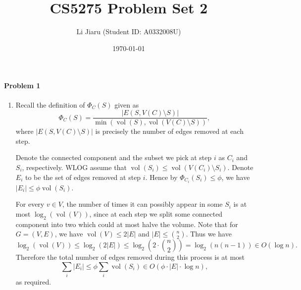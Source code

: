 \documentclass[12pt]{article}
\title{CS5275 Problem Set 2}
\author{Li Jiaru (Student ID: A0332008U)}
\date{\today}
\DeclareMathOperator{\vol}{vol}
\DeclareMathOperator{\sm}{\setminus}
\begin{document}
\maketitle
\paragraph{Problem 1}
\begin{enumerate}[label=\alph*., font=\bfseries]
\item Recall the definition of $\Phi_C(S)$ given as
$$\Phi_C(S)=\frac{|E(S,V(C)\sm S)|}{\min(\vol(S),\vol(V(C)\sm S))},$$
where $|E(S,V(C)\sm S)|$ is precisely the number of edges removed at each step.

Denote the connected component and the subset we pick at step $i$ as $C_i$ and $S_i$, respectively. WLOG assume that $\vol(S_i)\le\vol(V(C_i)\sm S_i)$. Denote $E_i$ to be the set of edges removed at step $i$. Hence by $\Phi_{C_i}(S_i)\le\phi$, we have $|E_i|\le\phi\vol(S_i)$.

For every $v\in V$, the number of times it can possibly appear in some $S_i$ is at most $\log_2(\vol(V))$, since at each step we split some connected component into two which could at most halve the volume. Note that for $G=(V,E)$, we have $\vol(V)\le2|E|$ and $|E|\le\binom{n}{2}$. Thus we have
$$\log_2(\vol(V))\le\log_2(2|E|)\le\log_2\left(2\cdot\binom{n}{2}\right)=\log_2(n(n-1))\in O(\log n).$$
Therefore the total number of edges removed during this process is at most
$$\sum_i|E_i|\le\phi\sum_i\vol(S_i)\in O(\phi\cdot|E|\cdot\log n),$$as required.
\end{enumerate}
\end{document}
